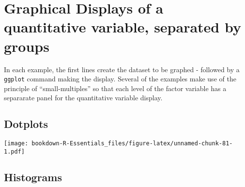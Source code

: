 \documentclass[
]{book}
\newenvironment{Shaded}{\begin{snugshade}}{\end{snugshade}}
\newcommand{\CommentTok}[1]{\textcolor[rgb]{0.56,0.35,0.01}{\textit{#1}}}
\newcommand{\DataTypeTok}[1]{\textcolor[rgb]{0.13,0.29,0.53}{#1}}
\newcommand{\DecValTok}[1]{\textcolor[rgb]{0.00,0.00,0.81}{#1}}
\newcommand{\KeywordTok}[1]{\textcolor[rgb]{0.13,0.29,0.53}{\textbf{#1}}}
\newcommand{\NormalTok}[1]{#1}
\newcommand{\OperatorTok}[1]{\textcolor[rgb]{0.81,0.36,0.00}{\textbf{#1}}}
\newcommand{\StringTok}[1]{\textcolor[rgb]{0.31,0.60,0.02}{#1}}
\begin{document}
\hypertarget{graphical-displays-of-a-quantitative-variable-separated-by-groups}{%
\section{Graphical Displays of a quantitative variable, separated by groups}\label{graphical-displays-of-a-quantitative-variable-separated-by-groups}}

In each example, the first lines create the dataset to be graphed - followed by a \texttt{ggplot} command making the display. Several of the examples make use of the principle of ``small-multiples'' so that each level of the factor variable has a separarate panel for the quantitative variable display.

\hypertarget{dotplots}{%
\subsection{Dotplots}\label{dotplots}}

\begin{Shaded}
\end{Shaded}

\texttt{[image: bookdown-R-Essentials\_files/figure-latex/unnamed-chunk-81-1.pdf]}

\hypertarget{histograms}{%
\subsection{Histograms}\label{histograms}}
\end{document}
